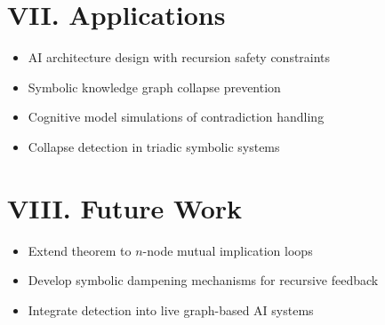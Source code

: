\documentclass[12pt]{article}
\begin{document}
\section*{VII. Applications}

\begin{itemize}
  \item AI architecture design with recursion safety constraints
  \item Symbolic knowledge graph collapse prevention
  \item Cognitive model simulations of contradiction handling
  \item Collapse detection in triadic symbolic systems
\end{itemize}

\section*{VIII. Future Work}

\begin{itemize}
  \item Extend theorem to $n$-node mutual implication loops
  \item Develop symbolic dampening mechanisms for recursive feedback
  \item Integrate detection into live graph-based AI systems
\end{itemize}
\end{document}
